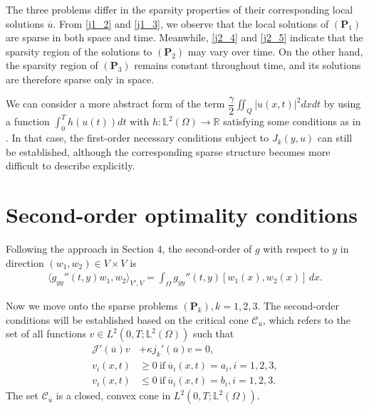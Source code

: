 \documentclass[reqno]{amsart}
\begin{document}
	\begin{remark}
		\rm{
			The three problems differ in the sparsity properties of their corresponding local solutions $\overline{u}$. From \eqref{j1_2} and \eqref{j1_3}, we observe that the local solutions of $(\textbf{P}_1)$ are sparse in both space and time. Meanwhile, \eqref{j2_4} and \eqref{j2_5} indicate that the sparsity region of the solutions to $(\textbf{P}_2)$ may vary over time. On the other hand, the sparsity region of $(\textbf{P}_3)$ remains constant throughout time, and its solutions are therefore sparse only in space.
		}
	\end{remark}
	\begin{remark}
		\rm{We can consider a more abstract form of the term $\displaystyle \dfrac{\gamma}{2} \iint_Q \vert u(x,t)\vert^2 dxdt$ by using a function $\displaystyle \int_0^T h(u(t))dt$ with $h: \mathbb{L}^2(\Omega) \rightarrow \mathbb{R}$ satisfying some conditions as in \cite{AS2025}. In that case, the first-order necessary conditions subject to $J_k(y,u)$ can still be established, although the corresponding sparse structure becomes more difficult to describe explicitly.
		}
	\end{remark}
	\section{Second-order optimality conditions}
	
	Following the approach in Section 4, the second-order of $g$ with respect to $y$ in direction $(w_1,w_2)\in V\times V$ is
	\begin{align*}
		\langle g_{yy}''(t,y)w_1,w_2 \rangle_{V',V}=\int_{\Omega}g_{yy}''(t,y)[w_1(x),w_2(x)]\,dx.
	\end{align*}
	
	Now we move onto the sparse problems $(\textbf{P}_k), k=1,2,3$.
	The second-order conditions will be established based on the critical cone $\mathcal{C}_{\overline{u}}$, which refers to the set of all functions $v\in L^2(0,T;\mathbb{L}^2(\Omega))$ such that 
	\begin{align}
		\mathcal{J}'(\overline{u})v &+ \kappa j_k'(\overline{u})v=0, \nonumber\\
		v_i(x,t) &\geq0 \ \text{if} \ \overline{u}_i(x,t)=a_i, i=1,2,3, \label{NUad_1} \\
		v_i(x,t) &\leq 0 \ \text{if} \ \overline{u}_i(x,t)= b_i, i =1,2,3. \label{NUad_2}
	\end{align}
	The set $\mathcal{C}_{\overline{u}}$ is a closed, convex cone in $L^2(0,T;\mathbb{L}^2(\Omega))$.
	
\end{document}
